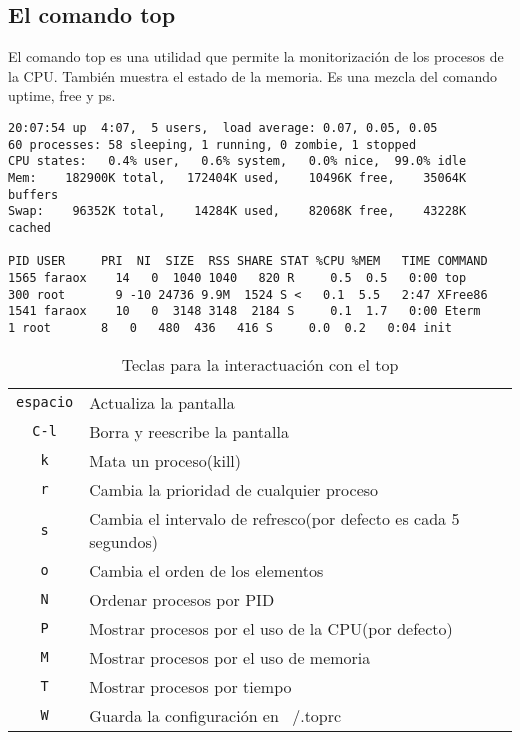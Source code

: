 \subsection{El comando top}
El comando  top es una utilidad  que permite la monitorización  de los
procesos de  la CPU. También muestra  el estado de la  memoria. Es una
mezcla del comando uptime, free y ps.

\begin{verbatim}
20:07:54 up  4:07,  5 users,  load average: 0.07, 0.05, 0.05
60 processes: 58 sleeping, 1 running, 0 zombie, 1 stopped
CPU states:   0.4% user,   0.6% system,   0.0% nice,  99.0% idle
Mem:    182900K total,   172404K used,    10496K free,    35064K buffers
Swap:    96352K total,    14284K used,    82068K free,    43228K cached

PID USER     PRI  NI  SIZE  RSS SHARE STAT %CPU %MEM   TIME COMMAND
1565 faraox    14   0  1040 1040   820 R     0.5  0.5   0:00 top
300 root       9 -10 24736 9.9M  1524 S <   0.1  5.5   2:47 XFree86
1541 faraox    10   0  3148 3148  2184 S     0.1  1.7   0:00 Eterm
1 root       8   0   480  436   416 S     0.0  0.2   0:04 init
\end{verbatim}
\begin{table}[htbp]
\centering
\begin{tabular}{|c|p{}|}
\hline
{\tt espacio} & Actualiza la pantalla \\
{\tt C-l} & Borra y reescribe la pantalla \\
{\tt k} & Mata un proceso(kill) \\
{\tt r} & Cambia la prioridad de cualquier proceso \\
{\tt s} & Cambia el intervalo de refresco(por defecto es cada 5 segundos) \\
{\tt o} & Cambia el orden de los elementos \\
{\tt N} & Ordenar procesos por PID \\
{\tt P} & Mostrar procesos por el uso de la CPU(por defecto)\\
{\tt M} & Mostrar procesos por el uso de memoria \\
{\tt T} & Mostrar procesos por tiempo \\
{\tt W} & Guarda la configuración  en ~/.toprc\\
\hline
\end{tabular}
\caption{Teclas para la interactuación con el top}
\end{table}

